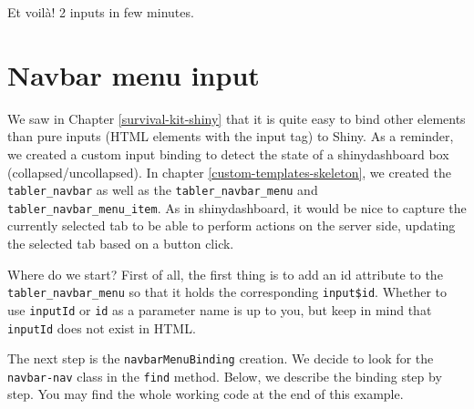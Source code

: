 \documentclass[]{book}
\newenvironment{Shaded}{\begin{snugshade}}{\end{snugshade}}
\newcommand{\AttributeTok}[1]{\textcolor[rgb]{0.77,0.63,0.00}{#1}}
\newcommand{\ControlFlowTok}[1]{\textcolor[rgb]{0.13,0.29,0.53}{\textbf{#1}}}
\newcommand{\DataTypeTok}[1]{\textcolor[rgb]{0.13,0.29,0.53}{#1}}
\newcommand{\KeywordTok}[1]{\textcolor[rgb]{0.13,0.29,0.53}{\textbf{#1}}}
\newcommand{\NormalTok}[1]{#1}
\newcommand{\OperatorTok}[1]{\textcolor[rgb]{0.81,0.36,0.00}{\textbf{#1}}}
\newcommand{\OtherTok}[1]{\textcolor[rgb]{0.56,0.35,0.01}{#1}}
\newcommand{\StringTok}[1]{\textcolor[rgb]{0.31,0.60,0.02}{#1}}
\begin{document}
Et voilà! 2 inputs in few minutes.

\hypertarget{navbar-menu-input}{%
\section{Navbar menu input}\label{navbar-menu-input}}

We saw in Chapter \ref{survival-kit-shiny} that it is quite easy to bind other elements than pure inputs (HTML elements with the input tag) to Shiny. As a reminder, we created a custom input binding to detect the state of a shinydashboard box (collapsed/uncollapsed).
In chapter \ref{custom-templates-skeleton}, we created the \texttt{tabler\_navbar} as well as the \texttt{tabler\_navbar\_menu} and \texttt{tabler\_navbar\_menu\_item}. As in shinydashboard, it would be nice to capture the currently selected tab to be able to perform actions on the server side, updating the selected tab based on a button click.

Where do we start? First of all, the first thing is to add an id attribute to the \texttt{tabler\_navbar\_menu} so that it holds the corresponding \texttt{input\$id}. Whether to use \texttt{inputId} or \texttt{id} as a parameter name is up to you, but keep in mind that \texttt{inputId} does not exist in HTML.

\begin{Shaded}
\end{Shaded}

The next step is the \texttt{navbarMenuBinding} creation. We decide to look for the \texttt{navbar-nav} class in the \texttt{find} method. Below, we describe the binding step by step. You may find the whole working code at the end of this example.

\begin{Shaded}
\end{Shaded}
\end{document}
